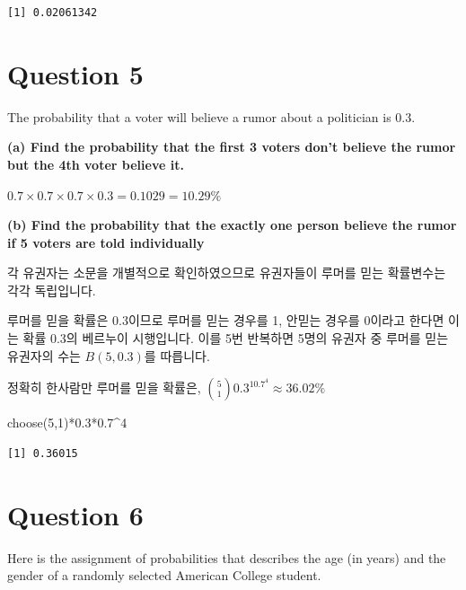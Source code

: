 \documentclass[
  letterpaper,
  DIV=11,
  numbers=noendperiod]{scrreprt}
\newenvironment{Shaded}{\begin{snugshade}}{\end{snugshade}}
\newcommand{\DecValTok}[1]{\textcolor[rgb]{0.68,0.00,0.00}{#1}}
\newcommand{\FloatTok}[1]{\textcolor[rgb]{0.68,0.00,0.00}{#1}}
\newcommand{\FunctionTok}[1]{\textcolor[rgb]{0.28,0.35,0.67}{#1}}
\newcommand{\NormalTok}[1]{\textcolor[rgb]{0.00,0.23,0.31}{#1}}
\newcommand{\SpecialCharTok}[1]{\textcolor[rgb]{0.37,0.37,0.37}{#1}}
\begin{document}
\begin{verbatim}
[1] 0.02061342
\end{verbatim}

\section*{Question 5}\label{question-5-1}


The probability that a voter will believe a rumor about a politician is
0.3.

\textbf{(a) Find the probability that the first 3 voters don't believe
the rumor but the 4th voter believe it.}

\(0.7\times 0.7\times 0.7\times 0.3=0.1029=10.29\%\)

\textbf{(b) Find the probability that the exactly one person believe the
rumor if 5 voters are told individually}

각 유권자는 소문을 개별적으로 확인하였으므로 유권자들이 루머를 믿는
확률변수는 각각 독립입니다.

루머를 믿을 확률은 0.3이므로 루머를 믿는 경우를 1, 안믿는 경우를 0이라고
한다면 이는 확률 0.3의 베르누이 시행입니다. 이를 5번 반복하면 5명의
유권자 중 루머를 믿는 유권자의 수는 \(B(5,0.3)\)를 따릅니다.

정확히 한사람만 루머를 믿을 확률은,
\({5\choose1}0.3^10.7^4\approx 36.02\%\)

\begin{Shaded}
\begin{Highlighting}[]
\FunctionTok{choose}\NormalTok{(}\DecValTok{5}\NormalTok{,}\DecValTok{1}\NormalTok{)}\SpecialCharTok{*}\FloatTok{0.3}\SpecialCharTok{*}\FloatTok{0.7}\SpecialCharTok{\^{}}\DecValTok{4}
\end{Highlighting}
\end{Shaded}

\begin{verbatim}
[1] 0.36015
\end{verbatim}

\section*{Question 6}\label{question-6}


Here is the assignment of probabilities that describes the age (in
years) and the gender of a randomly selected American College student.
\end{document}
